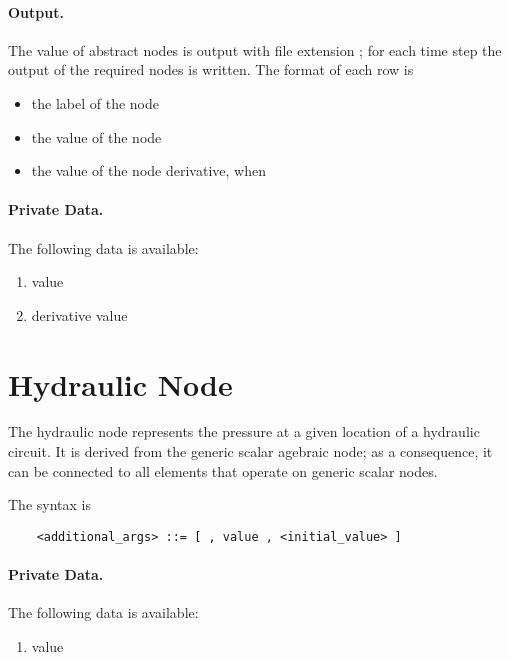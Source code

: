 \paragraph{Output.}
The value of abstract nodes is output with file extension ; for
each time step the output of the required nodes is written.
The format of each row is
\begin{itemize}
    \item the label of the node
    \item the value of the node
    \item the value of the node derivative, when 
\end{itemize}

\paragraph{Private Data.}
\label{sec:NODE:ABSTRACT:PRIV}
The following data is available:
\begin{enumerate}
\item {} value
\item {} derivative value
\end{enumerate}



\section{Hydraulic Node}
\label{sec:NODE:HYDRAULIC}
The hydraulic node represents the pressure
at a given location of a hydraulic circuit.
It is derived from the generic scalar agebraic node; as a consequence,
it can be connected to all elements that operate on generic scalar nodes. 

The syntax is
\begin{verbatim}
    <additional_args> ::= [ , value , <initial_value> ]
\end{verbatim}

\paragraph{Private Data.}
\label{sec:NODE:HYDRAULIC:PRIV}
The following data is available:
\begin{enumerate}
\item {} value
\end{enumerate}



